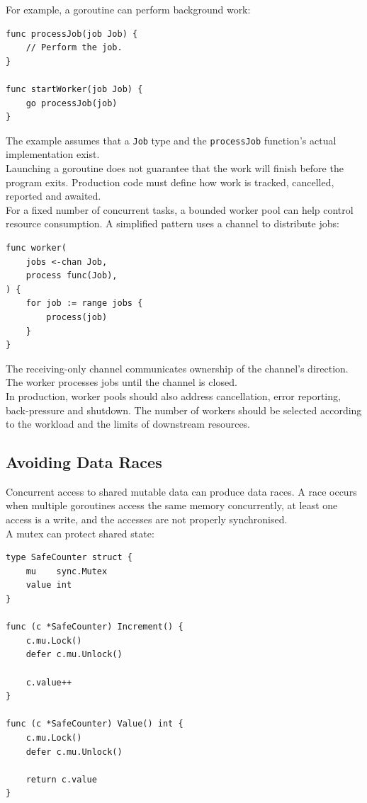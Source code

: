 For example, a goroutine can perform background work:

\begin{lstlisting}
func processJob(job Job) {
    // Perform the job.
}

func startWorker(job Job) {
    go processJob(job)
}
\end{lstlisting}

The example assumes that a \texttt{Job} type and the \texttt{processJob} function's actual implementation exist.\\

Launching a goroutine does not guarantee that the work will finish before the program exits. Production code must define how work is tracked, cancelled, reported and awaited.\\

For a fixed number of concurrent tasks, a bounded worker pool can help control resource consumption. A simplified pattern uses a channel to distribute jobs:

\begin{lstlisting}
func worker(
    jobs <-chan Job,
    process func(Job),
) {
    for job := range jobs {
        process(job)
    }
}
\end{lstlisting}

The receiving-only channel communicates ownership of the channel's direction. The worker processes jobs until the channel is closed.\\

In production, worker pools should also address cancellation, error reporting, back-pressure and shutdown. The number of workers should be selected according to the workload and the limits of downstream resources.

\subsection{Avoiding Data Races}

Concurrent access to shared mutable data can produce data races. A race occurs when multiple goroutines access the same memory concurrently, at least one access is a write, and the accesses are not properly synchronised.\\

A mutex can protect shared state:

\begin{lstlisting}
type SafeCounter struct {
    mu    sync.Mutex
    value int
}

func (c *SafeCounter) Increment() {
    c.mu.Lock()
    defer c.mu.Unlock()

    c.value++
}

func (c *SafeCounter) Value() int {
    c.mu.Lock()
    defer c.mu.Unlock()

    return c.value
}
\end{lstlisting}

